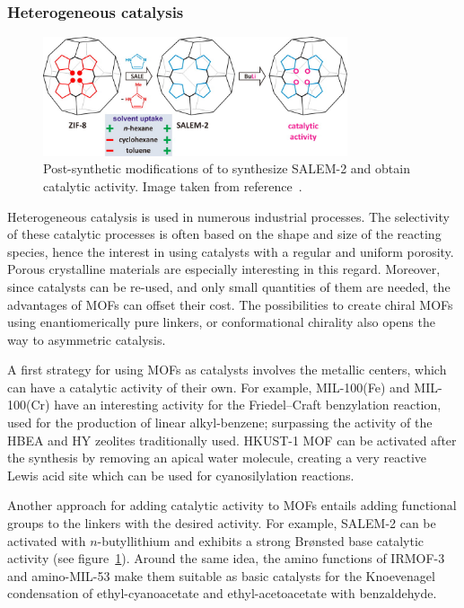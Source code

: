 \documentclass[thesis]{subfiles}
\begin{document}
\subsubsection{Heterogeneous catalysis}

\begin{figure}[ht]
    \centering
    \includegraphics[width=0.8\textwidth]{figures/cited/zif8-to-salem2}
    \caption{Post-synthetic modifications of  to synthesize SALEM-2 and
    obtain catalytic activity. Image taken from reference~\cite{Karagiaridi2012}.}
    \label{fig:zif8-to-salem2}
\end{figure}

Heterogeneous catalysis is used in numerous industrial processes. The
selectivity of these catalytic processes is often based on the shape and size of
the reacting species, hence the interest in using catalysts with a regular and
uniform porosity. Porous crystalline materials are especially interesting in
this regard. Moreover, since catalysts can be re-used, and only small
quantities of them are needed, the advantages of MOFs can offset their cost. The
possibilities to create chiral MOFs using enantiomerically pure linkers, or
conformational chirality\cite{Tshabang2018} also opens the way to asymmetric
catalysis.

A first strategy for using MOFs as catalysts involves the metallic centers,
which can have a catalytic activity of their own. For example, MIL-100(Fe) and
MIL-100(Cr) have an interesting activity for the Friedel--Craft benzylation
reaction, used for the production of linear alkyl-benzene; surpassing the
activity of the HBEA and HY zeolites traditionally used\cite{Horcajada2007}.
HKUST-1 MOF can be activated after the synthesis by removing an apical water
molecule, creating a very reactive Lewis acid site which can be used for
cyanosilylation reactions\cite{Schlichte2004}.

Another approach for adding catalytic activity to MOFs entails adding functional
groups to the linkers with the desired activity. For example, SALEM-2 can be
activated with $n$-butyllithium and exhibits a strong Brønsted base catalytic
activity\cite{Karagiaridi2012} (see figure~\ref{fig:zif8-to-salem2}). Around
the same idea, the amino functions of IRMOF-3 and amino-MIL-53 make them
suitable as basic catalysts for the Knoevenagel condensation of
ethyl-cyanoacetate and ethyl-acetoacetate with benzaldehyde\cite{Gascon2009}.
\end{document}
